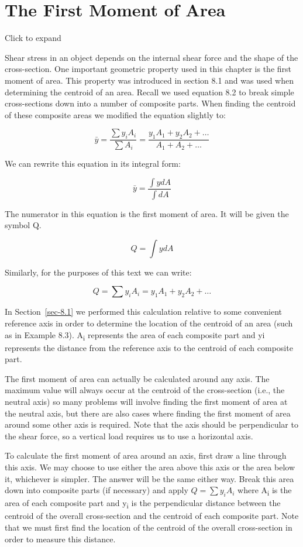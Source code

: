 \documentclass[
  letterpaper,
  DIV=11,
  numbers=noendperiod]{scrreprt}
\begin{document}
\section{The First Moment of Area}\label{sec-10.1}

Click to expand

Shear stress in an object depends on the internal shear force and the
shape of the cross-section. One important geometric property used in
this chapter is the first moment of area. This property was introduced
in section 8.1 and was used when determining the centroid of an area.
Recall we used equation 8.2 to break simple cross-sections down into a
number of composite parts. When finding the centroid of these composite
areas we modified the equation slightly to:

\[
\bar{y}=\frac{\sum y_i A_i}{\sum A_i}=\frac{y_1 A_1+y_2 A_2+\ldots}{A_1+A_2+\ldots}
\]

We can rewrite this equation in its integral form:

\[
\bar{y}=\frac{\int y d A}{\int d A}
\]

The numerator in this equation is the first moment of area. It will be
given the symbol Q.

\[
Q=\int y d A
\]

Similarly, for the purposes of this text we can write:

\[
Q=\sum y_i A_i=y_1 A_1+y_2 A_2+\ldots
\]

In Section~\ref{sec-8.1} we performed this calculation relative to some
convenient reference axis in order to determine the location of the
centroid of an area (such as in Example 8.3). A\textsubscript{i}
represents the area of each composite part and yi represents the
distance from the reference axis to the centroid of each composite part.

The first moment of area can actually be calculated around any axis. The
maximum value will always occur at the centroid of the cross-section
(i.e., the neutral axis) so many problems will involve finding the first
moment of area at the neutral axis, but there are also cases where
finding the first moment of area around some other axis is required.
Note that the axis should be perpendicular to the shear force, so a
vertical load requires us to use a horizontal axis.

To calculate the first moment of area around an axis, first draw a line
through this axis. We may choose to use either the area above this axis
or the area below it, whichever is simpler. The answer will be the same
either way. Break this area down into composite parts (if necessary) and
apply \(Q=\sum y_i A_i\) where A\textsubscript{i} is the area of each
composite part and y\textsubscript{i} is the perpendicular distance
between the centroid of the overall cross-section and the centroid of
each composite part. Note that we must first find the location of the
centroid of the overall cross-section in order to measure this distance.
\end{document}
